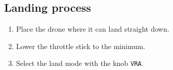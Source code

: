         \subsection{Landing process}
            \begin{enumerate}
                \item Place the drone where it can land straight down.
                \item Lower the throttle stick to the minimum.
                \item Select the land mode with the knob \texttt{VRA}.
            \end{enumerate}